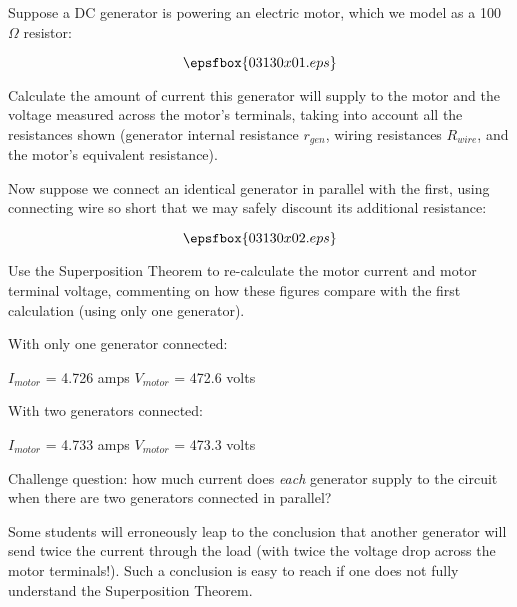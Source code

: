 

Suppose a DC generator is powering an electric motor, which we model as a 100 $\Omega$ resistor:

$$\epsfbox{03130x01.eps}$$

Calculate the amount of current this generator will supply to the motor and the voltage measured across the motor's terminals, taking into account all the resistances shown (generator internal resistance $r_{gen}$, wiring resistances $R_{wire}$, and the motor's equivalent resistance).

Now suppose we connect an identical generator in parallel with the first, using connecting wire so short that we may safely discount its additional resistance:

$$\epsfbox{03130x02.eps}$$

Use the Superposition Theorem to re-calculate the motor current and motor terminal voltage, commenting on how these figures compare with the first calculation (using only one generator).







\noindent
With only one generator connected:

$I_{motor}$ = 4.726 amps \hskip 30pt $V_{motor}$ = 472.6 volts

\vskip 10pt

\noindent
With two generators connected:

$I_{motor}$ = 4.733 amps \hskip 30pt $V_{motor}$ = 473.3 volts

\vskip 20pt

Challenge question: how much current does {\it each} generator supply to the circuit when there are two generators connected in parallel?







Some students will erroneously leap to the conclusion that another generator will send twice the current through the load (with twice the voltage drop across the motor terminals!).  Such a conclusion is easy to reach if one does not fully understand the Superposition Theorem.




